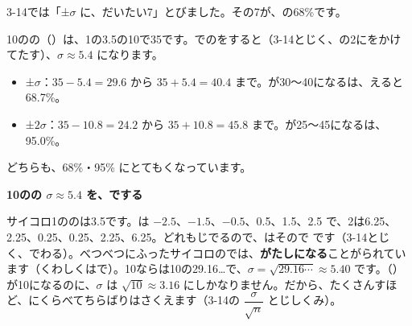 3-14では「±$\sigma$ に、だいたい7」とびました。その7が、の68\%です。

10のの（）は、1の3.5の10で35です。でのをすると（3-14とじく、の2にをかけてたす）、$\sigma\approx5.4$ になります。
\begin{itemize}[leftmargin=1.4\zw, itemsep=1pt, topsep=2pt, label={\color{bkBlue}●}]
\item {}±$\sigma$：$35-5.4=29.6$ から $35+5.4=40.4$ まで。が30〜40になるは、えると68.7\%。
\item {}±$2\sigma$：$35-10.8=24.2$ から $35+10.8=45.8$ まで。が25〜45になるは、95.0\%。
\end{itemize}
どちらも、68\%・95\% にとてもくなっています。

\begin{motto}[3]
\textbf{10のの $\sigma\approx5.4$ を、でする}\par
サイコロ1ののは3.5です。は $-2.5$、$-1.5$、$-0.5$、0.5、1.5、2.5 で、2は6.25、2.25、0.25、0.25、2.25、6.25。どれもじでるので、はそので
です（3-14とじく、でわる）。べつべつにふったサイコロのでは、\textbf{がたしになる}ことがられています（くわしくはで）。10ならは10の29.16…で、$\sigma=\sqrt{29.16\cdots}\approx5.40$ です。（）が10になるのに、$\sigma$ は $\sqrt{10}\approx3.16$ にしかなりません。だから、たくさんすほど、にくらべてちらばりはさくえます（3-14の $\dfrac{\sigma}{\sqrt{n}}$ とじしくみ）。
\end{motto}

